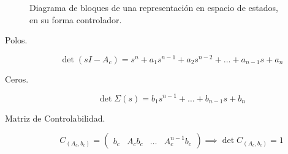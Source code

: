 \begin{figure*}
{}
            \caption{\label{dia:contro3}Diagrama de bloques de una representación en espacio de estados, en su forma controlador.}
        \end{figure*}

        \begin{description}
            \item [Polos.]

            \begin{equation}
                \det{(sI - A_c)} = s^n + a_1 s^{n-1} + a_2 s^{n-2} + \dots + a_{n-1} s + a_n
            \end{equation}

            \item [Ceros.]

            \begin{equation}
                \det{\Sigma(s)} = b_1 s^{n-1} + \dots + b_{n-1} s + b_n
            \end{equation}

            \item [Matriz de Controlabilidad.]

            \begin{equation}
                C_{(A_c, b_c)} =
                \begin{pmatrix}
                    b_c & A_c b_c & \dots & A_c^{n-1} b_c
                \end{pmatrix} \implies \det{C_{(A_c, b_c)}} = 1
            \end{equation}
        \end{description}


